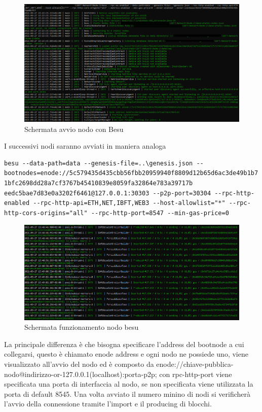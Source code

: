 \documentclass[11pt,a4paper,titlepage, twoside, openright]{report}
\begin{document}
\begin{figure}[h]
	\includegraphics[width=\textwidth]{Besu-avvio}
	\centering
	\caption{Schermata avvio nodo con Besu}
	\label{fig:sch-avvio-besu}
\end{figure}

I successivi nodi saranno avviati in maniera analoga
\begin{lstlisting}[language=command.com]
besu --data-path=data --genesis-file=..\genesis.json --bootnodes=enode://5c579435d435cbb56fbb20959940f8809d12b65d6ac3de49b1b7 1bfc2698dd28a7cf3767b45410839e8059fa32864e783a39717b eedc5bae7d83e0a3202f6461@127.0.0.1:30303 --p2p-port=30304 --rpc-http-enabled --rpc-http-api=ETH,NET,IBFT,WEB3 --host-allowlist="*" --rpc-http-cors-origins="all" --rpc-http-port=8547 --min-gas-price=0
\end{lstlisting}

\begin{figure}[h]
	\includegraphics[width=\textwidth]{Besu-imported-produced}
	\centering
	\caption{Schermata funzionamento nodo besu}
	\label{fig:besu-imported-produced}
\end{figure}

La principale differenza è che bisogna specificare l'address del bootnode a cui collegarsi, questo è chiamato enode address e ogni nodo ne possiede uno, viene visualizzato all'avvio del nodo ed è composto da 
enode://chiave-pubblica-nodo@indirizzo-or-127.0.0.1(localhost):porta-p2p; con rpc-http-port viene specificata una porta di interfaccia al nodo, se non specificata viene utilizzata la porta di default 8545. Una volta avviato il numero minino di nodi si verificherà l'avvio della connessione tramite l'import e il producing di blocchi.
\end{document}
